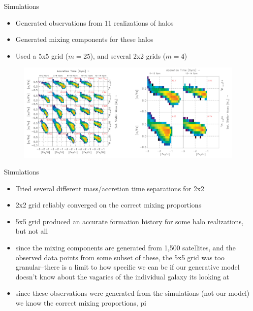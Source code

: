 \documentclass{beamer}
\begin{document}
\begin{frame}{Simulations}
	
	
	
	
	\begin{itemize}
		\item Generated observations from 11 realizations of halos
		\item Generated mixing components for these halos
		\item Used a 5x5 grid ($m=25$), and several 2x2 grids ($m=4$)
	\end{itemize}
	
	
	
	\begin{figure}
			\begin{center}
				\includegraphics[width=\textwidth]{ourdens.pdf}
			\end{center}
	\end{figure}
	
	
	
	
\end{frame}
\begin{frame}[shrink]{Simulations}
	
	\begin{itemize}
		\item Tried several different mass/accretion time separations for 2x2
		\item 2x2 grid reliably converged on the correct mixing proportions
		\item 5x5 grid produced an accurate formation history for some halo realizations, but not all
		\item since the mixing components are generated from 1,500 satellites, and the observed data points from some subset of these, the 5x5 grid was too granular--there is a limit to how specific we can be if our generative model doesn't know about the vagaries of the individual galaxy its looking at
		\item since these observations were generated from the simulations (not our model) we know the correct mixing proportions, pi
	\end{itemize}
	
\end{frame}
\end{document}
